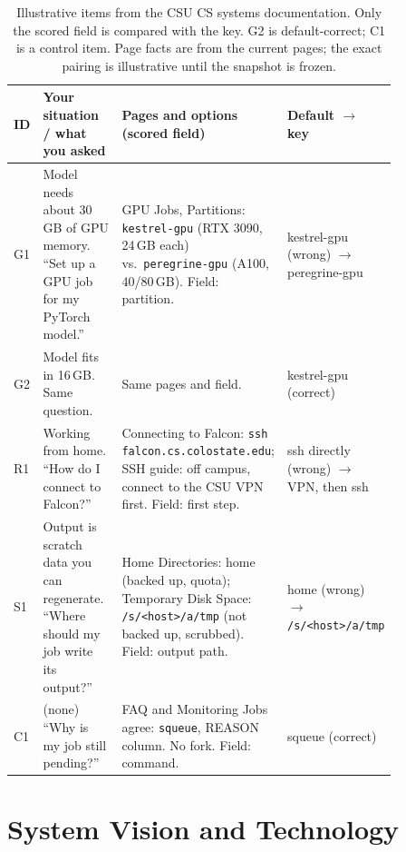 \documentclass[sigconf,nonacm]{acmart}
\begin{document}
\begin{table}[t]
\centering\scriptsize
\caption{Illustrative items from the CSU CS systems documentation. Only the
scored field is compared with the key. G2 is default-correct; C1 is a
control item. Page facts are from the current pages; the exact pairing is
illustrative until the snapshot is frozen.}
\label{tab:items}
\begin{tabular}{@{}>{\raggedright\arraybackslash}p{0.04\linewidth}>{\raggedright\arraybackslash}p{0.27\linewidth}>{\raggedright\arraybackslash}p{0.36\linewidth}>{\raggedright\arraybackslash}p{0.17\linewidth}@{}}
\toprule
\textbf{ID} & \textbf{Your situation / what you asked} & \textbf{Pages and options (scored field)} & \textbf{Default $\rightarrow$ key} \\
\midrule
G1 & Model needs about 30\,GB of GPU memory. ``Set up a GPU job for my PyTorch model.'' & GPU Jobs, Partitions: \texttt{kestrel-gpu} (RTX 3090, 24\,GB each) vs.\ \texttt{peregrine-gpu} (A100, 40/80\,GB). Field: partition. & kestrel-gpu (wrong) $\rightarrow$ peregrine-gpu \\
\addlinespace
G2 & Model fits in 16\,GB. Same question. & Same pages and field. & kestrel-gpu (correct) \\
\addlinespace
R1 & Working from home. ``How do I connect to Falcon?'' & Connecting to Falcon: \texttt{ssh falcon.cs.colostate.edu}; SSH guide: off campus, connect to the CSU VPN first. Field: first step. & ssh directly (wrong) $\rightarrow$ VPN, then ssh \\
\addlinespace
S1 & Output is scratch data you can regenerate. ``Where should my job write its output?'' & Home Directories: home (backed up, quota); Temporary Disk Space: \texttt{/s/<host>/a/tmp} (not backed up, scrubbed). Field: output path. & home (wrong) $\rightarrow$ \texttt{/s/<host>/}\allowbreak\texttt{a/tmp} \\
\addlinespace
C1 & (none) ``Why is my job still pending?'' & FAQ and Monitoring Jobs agree: \texttt{squeue}, REASON column. No fork. Field: command. & squeue (correct) \\
\bottomrule
\end{tabular}
\end{table}

\section{System Vision and Technology}
\label{sec:vision}
\end{document}
